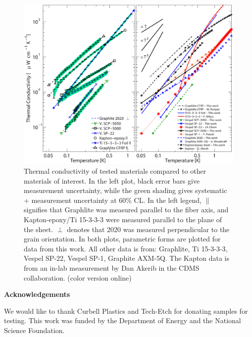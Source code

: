 \documentclass[final]{svjour2}
\begin{document}
\begin{figure}[h]
\includegraphics[width = 1\textwidth,trim = 0 0 0 0]{K_plots.eps}
\caption{{\small Thermal conductivity of tested materials compared to other materials of interest. In the left plot, black error bars give measurement uncertainty, while the green shading gives systematic + measurement uncertainty at 60\% CL. In the left legend, $\parallel$ signifies that Graphlite was measured parallel to the fiber axis, and Kapton-epoxy/Ti 15-3-3-3 were measured parallel to the plane of the sheet. $\perp$ denotes that 2020 was measured perpendicular to the grain orientation. In both plots, parametric forms are plotted for data from this work. All other data is from: Graphlite\cite{Runyan2008}, Ti 15-3-3-3\cite{Wikus2010}, Vespel SP-22\cite{Olson1993}, Vespel SP-1\cite{Pobell1992}, Graphite AXM-5Q\cite{Woodcraft2009}. The Kapton data is from an in-lab measurement by Dan Akerib in the CDMS collaboration. (color version online)}}
\label{plots}
\end{figure}

\noindent \textbf{Acknowledgements}

\noindent We would like to thank Curbell Plastics and Tech-Etch for donating samples for testing. This work was funded by the Department of Energy and the National Science Foundation.


\vspace{-0.41cm}
\end{document}
